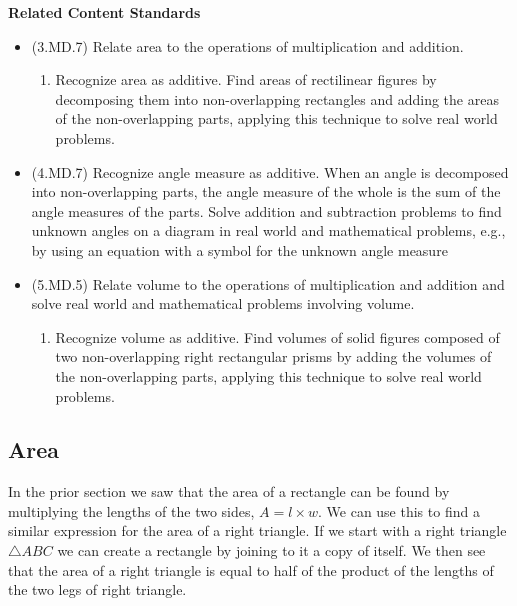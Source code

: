 \documentclass[
]{book}
\providecommand{\tightlist}{%
  \setlength{\itemsep}{0pt}\setlength{\parskip}{0pt}}
\newenvironment{standards}{}{}
\theoremstyle{definition}
\theoremstyle{definition}
\theoremstyle{definition}
\theoremstyle{definition}
\theoremstyle{remark}
\begin{document}
\begin{standards}

\begin{center}
\textbf{Related Content Standards}

\end{center}

\begin{itemize}
\item
  (3.MD.7) Relate area to the operations of multiplication and addition.

  \begin{enumerate}
  \def\labelenumi{\alph{enumi}.}
  \setcounter{enumi}{3}
  \tightlist
  \item
    Recognize area as additive. Find areas of rectilinear figures by decomposing them into non-overlapping rectangles and adding the areas of the non-overlapping parts, applying this technique to solve real world problems.
  \end{enumerate}
\item
  (4.MD.7) Recognize angle measure as additive. When an angle is decomposed into non-overlapping parts, the angle measure of the whole is the sum of the angle measures of the parts. Solve addition and subtraction problems to find unknown angles on a diagram in real world and mathematical problems, e.g., by using an equation with a symbol for the unknown angle measure
\item
  (5.MD.5) Relate volume to the operations of multiplication and addition and solve real world and mathematical problems involving volume.

  \begin{enumerate}
  \def\labelenumi{\alph{enumi}.}
  \setcounter{enumi}{2}
  \tightlist
  \item
    Recognize volume as additive. Find volumes of solid figures composed of two non-overlapping right rectangular prisms by adding the volumes of the non-overlapping parts, applying this technique to solve real world problems.
  \end{enumerate}
\end{itemize}

\end{standards}

\hypertarget{area}{%
\subsection{Area}\label{area}}

In the prior section we saw that the area of a rectangle can be found by multiplying the lengths of the two sides, \(A= l \times w\). We can use this to find a similar expression for the area of a right triangle. If we start with a right triangle \(\triangle ABC\) we can create a rectangle by joining to it a copy of itself. We then see that the area of a right triangle is equal to half of the product of the lengths of the two legs of right triangle.
\end{document}
